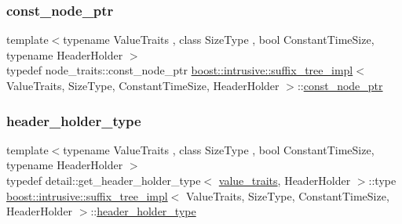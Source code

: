 \mbox{\label{classboost_1_1intrusive_1_1suffix__tree__impl_a5cf354495727a0b22948de4115d0a2b8}} 
\subsubsection{\texorpdfstring{const\+\_\+node\+\_\+ptr}{const\_node\_ptr}}
{\footnotesize\ttfamily template$<$typename Value\+Traits , class Size\+Type , bool Constant\+Time\+Size, typename Header\+Holder $>$ \\
typedef node\+\_\+traits\+::const\+\_\+node\+\_\+ptr \hyperlink{classboost_1_1intrusive_1_1suffix__tree__impl}{boost\+::intrusive\+::suffix\+\_\+tree\+\_\+impl}$<$ Value\+Traits, Size\+Type, Constant\+Time\+Size, Header\+Holder $>$\+::\hyperlink{classboost_1_1intrusive_1_1suffix__tree__impl_a5cf354495727a0b22948de4115d0a2b8}{const\+\_\+node\+\_\+ptr}}

\mbox{\label{classboost_1_1intrusive_1_1suffix__tree__impl_acb00482132fdd79dc983b313f596e364}} 
\subsubsection{\texorpdfstring{header\+\_\+holder\+\_\+type}{header\_holder\_type}}
{\footnotesize\ttfamily template$<$typename Value\+Traits , class Size\+Type , bool Constant\+Time\+Size, typename Header\+Holder $>$ \\
typedef detail\+::get\+\_\+header\+\_\+holder\+\_\+type$<$ \hyperlink{classboost_1_1intrusive_1_1suffix__tree__impl_a30d9e164c38c11cd38917ad14e9f3e88}{value\+\_\+traits}, Header\+Holder $>$\+::type \hyperlink{classboost_1_1intrusive_1_1suffix__tree__impl}{boost\+::intrusive\+::suffix\+\_\+tree\+\_\+impl}$<$ Value\+Traits, Size\+Type, Constant\+Time\+Size, Header\+Holder $>$\+::\hyperlink{classboost_1_1intrusive_1_1suffix__tree__impl_acb00482132fdd79dc983b313f596e364}{header\+\_\+holder\+\_\+type}}


